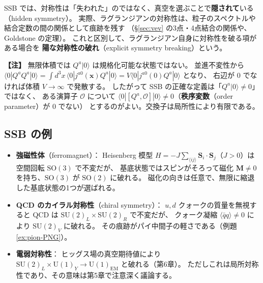 \documentclass[uplatex,dvipdfmx,a4paper,11pt,openany]{jsbook}
\newcommand{\term}[2]{\textbf{#1}（#2）}
\newcommand{\en}[1]{（#1）}
\newenvironment{note}{\vspace{1ex}\par\footnotesize\noindent\textbf{【注】}}{\par\vspace{1ex}}
\numberwithin{equation}{chapter}
\theoremstyle{definition}
\theoremstyle{plain}
\theoremstyle{remark}
\newcommand{\SU}{\mathrm{SU}}
\newcommand{\U}{\mathrm{U}}
\newcommand{\SO}{\mathrm{SO}}
\begin{document}
SSB では、対称性は「失われた」のではなく、真空を選ぶことで\textbf{隠されて}いる\en{hidden symmetry}。
実際、ラグランジアンの対称性は、粒子のスペクトルや結合定数の間の関係として痕跡を残す
（\S\ref{sec:vev} の3点・4点結合の関係や、Goldstone の定理）。
これと区別して、ラグランジアン自身に対称性を破る項がある場合を
\term{陽な対称性の破れ}{explicit symmetry breaking}という。
\begin{note}
無限体積では $Q^a|0\rangle$ は規格化可能な状態ではない。
並進不変性から $\langle0|Q^aQ^a|0\rangle=\int d^3x\,\langle0|j^{a0}(\bm x)Q^a|0\rangle=V\langle0|j^{a0}(0)Q^a|0\rangle$ となり、
右辺が 0 でなければ体積 $V\to\infty$ で発散する。
したがって SSB の正確な定義は「$Q^a|0\rangle\ne0$」ではなく、
ある演算子 $\mathcal O$ について $\langle0|[Q^a,\mathcal O]|0\rangle\ne0$（\term{秩序変数}{order parameter}が 0 でない）
とするのがよい。交換子は局所性により有限である。
\end{note}
\subsection{SSB の例}
\begin{itemize}
    \item \textbf{強磁性体}\en{ferromagnet}：
    Heisenberg 模型 $H=-J\sum_{\langle ij\rangle}\bm S_i\cdot\bm S_j$（$J>0$）は空間回転 $\SO(3)$ で不変だが、
    基底状態ではスピンがそろって磁化 $\bm M\ne0$ を持ち、$\SO(3)$ が $\SO(2)$ に破れる。
    磁化の向きは任意で、無限に縮退した基底状態の1つが選ばれる。
    \item \textbf{QCD のカイラル対称性}\en{chiral symmetry}：
    $u,d$ クォークの質量を無視すると QCD は $\SU(2)_L\times\SU(2)_R$ で不変だが、
    クォーク凝縮 $\langle\bar qq\rangle\ne0$ により $\SU(2)_V$ に破れる。
    その痕跡がパイ中間子の軽さである（例題\ref{ex:pion-PNG}）。
    \item \textbf{電弱対称性}：
    ヒッグス場の真空期待値により $\SU(2)_L\times\U(1)_Y\to\U(1)_{\mathrm{EM}}$ と破れる（第6章）。
    ただしこれは局所対称性であり、その意味は第5章で注意深く議論する。
\end{itemize}
\end{document}
